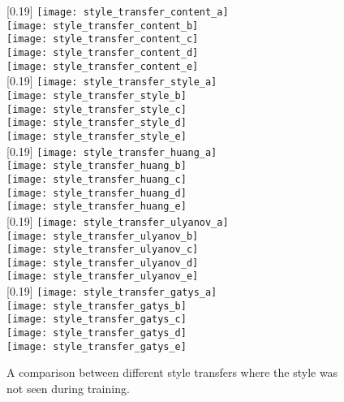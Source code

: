\begin{figure}
	\centering
	[0.19\textwidth]{
		\texttt{[image: style\_transfer\_content\_a]}\\
		\texttt{[image: style\_transfer\_content\_b]}\\
		\texttt{[image: style\_transfer\_content\_c]}\\
		\texttt{[image: style\_transfer\_content\_d]}\\
		\texttt{[image: style\_transfer\_content\_e]}\\
	}
	[0.19\textwidth]{
		\texttt{[image: style\_transfer\_style\_a]}\\
		\texttt{[image: style\_transfer\_style\_b]}\\
		\texttt{[image: style\_transfer\_style\_c]}\\
		\texttt{[image: style\_transfer\_style\_d]}\\
		\texttt{[image: style\_transfer\_style\_e]}\\
	}
	[0.19\textwidth]{
		\texttt{[image: style\_transfer\_huang\_a]}\\
		\texttt{[image: style\_transfer\_huang\_b]}\\
		\texttt{[image: style\_transfer\_huang\_c]}\\
		\texttt{[image: style\_transfer\_huang\_d]}\\
		\texttt{[image: style\_transfer\_huang\_e]}\\
	}
	[0.19\textwidth]{
		\texttt{[image: style\_transfer\_ulyanov\_a]}\\
		\texttt{[image: style\_transfer\_ulyanov\_b]}\\
		\texttt{[image: style\_transfer\_ulyanov\_c]}\\
		\texttt{[image: style\_transfer\_ulyanov\_d]}\\
		\texttt{[image: style\_transfer\_ulyanov\_e]}\\
	}
	[0.19\textwidth]{
		\texttt{[image: style\_transfer\_gatys\_a]}\\
		\texttt{[image: style\_transfer\_gatys\_b]}\\
		\texttt{[image: style\_transfer\_gatys\_c]}\\
		\texttt{[image: style\_transfer\_gatys\_d]}\\
		\texttt{[image: style\_transfer\_gatys\_e]}\\
	}
	\caption{A comparison between different style transfers where the style was not seen during training.}
	\label{fig:style_transfer_unseen_style}
\end{figure}

